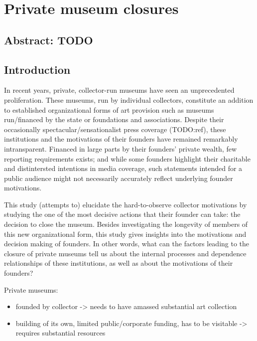 \documentclass[11pt]{article}
\author{Johannes }
\date{\today}
\title{}
\begin{document}
\section*{Private museum closures}


\subsection*{Abstract: TODO}


\subsection*{Introduction}


In recent years, private, collector-run museums have seen an unprecedented proliferation.
These museums, run by individual collectors, constitute an addition to established organizational forms of art provision such as museums run/financed by the state or foundations and associations.
Despite their occasionally spectacular/sensationalist press coverage (TODO:ref), these institutions and the motivations of their founders have remained remarkably intransparent.
Financed in large parts by their founders' private wealth, few reporting requirements exists; and while some founders highlight their charitable and distintersted intentions in media coverage, such statements intended for a public audience might not necessarily accurately reflect underlying founder motivations.



This study (attempts to) elucidate the hard-to-observe collector motivations by studying the one of the most decisive actions that their founder can take: the decision to close the museum.
Besides investigating the longevity of members of this new organizational form, this study gives insights into the motivations and decision making of founders.
In other words, what can the factors leading to the closure of private museums tell us about the internal processes and dependence relationships of these institutions, as well as about the motivations of their founders?





\bigbreak
\noindent
Private museums:
\begin{itemize}
\item founded by collector -> needs to have amassed substantial art collection
\item building of its own, limited public/corporate funding, has to be visitable -> requires substantial resources
\end{itemize}
\end{document}
